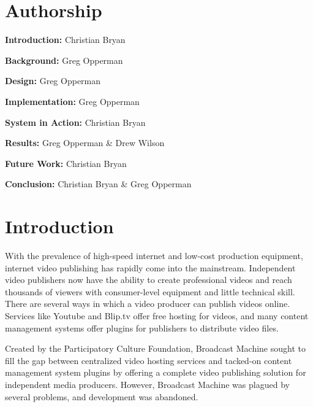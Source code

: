 \documentclass[a4paper,12pt]{report}
\begin{document}
\chapter*{Authorship}
\begin{description}
  \item{\textbf{Introduction: }Christian Bryan}
  \item{\textbf{Background: }Greg Opperman}
  \item{\textbf{Design: }Greg Opperman}
  \item{\textbf{Implementation: }Greg Opperman}
  \item{\textbf{System in Action: }Christian Bryan}
  \item{\textbf{Results: } Greg Opperman \& Drew Wilson}
  \item{\textbf{Future Work: }Christian Bryan}
    \item{\textbf{Conclusion: }Christian Bryan \& Greg Opperman}
\end{description}

\tableofcontents

\chapter{Introduction}
With the prevalence of high-speed internet and low-cost production equipment, internet video publishing has rapidly come into the mainstream. Independent video publishers now have the ability to create professional videos and reach thousands of viewers with consumer-level equipment and little technical skill. There are several ways in which a video producer can publish videos online. Services like Youtube and Blip.tv offer free hosting for videos, and many content management systems offer plugins for publishers to distribute video files.

Created by the Participatory Culture Foundation, Broadcast Machine sought to fill the gap between centralized video hosting services and tacked-on content management system plugins by offering a complete video publishing solution for independent media producers. However, Broadcast Machine was plagued by several problems, and development was abandoned.
\end{document}
